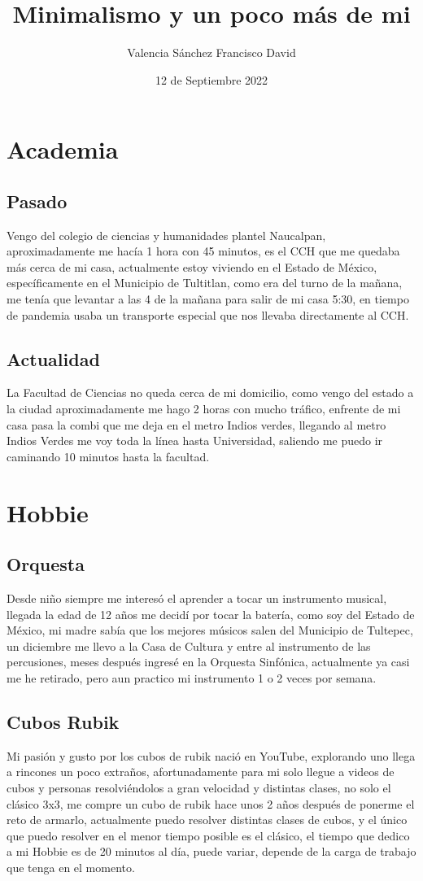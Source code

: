\documentclass[12pt, letterpaper]{article}
\title{Minimalismo y un poco más de mi}
\author{Valencia Sánchez Francisco David}
\date{12 de Septiembre 2022}
\begin{document}
\maketitle

\section{\huge{Academia} }
\subsection{\Large{Pasado}}
Vengo del colegio de ciencias y humanidades plantel Naucalpan, aproximadamente me hacía 1 hora con 45 minutos, es el CCH que me quedaba más cerca de mi casa, actualmente estoy viviendo en el Estado de México, específicamente en el Municipio de Tultitlan, como era del turno de la mañana, me tenía que levantar a las 4 de la mañana para salir de mi casa 5:30, en tiempo de pandemia usaba un transporte especial que nos llevaba directamente al CCH.
\subsection{\Large{Actualidad}}
La Facultad de Ciencias no queda cerca de mi domicilio, como vengo del estado a la ciudad aproximadamente me hago 2 horas con mucho tráfico, enfrente de mi casa pasa la combi que me deja en el metro Indios verdes, llegando al metro Indios Verdes me voy toda la línea hasta Universidad, saliendo me puedo ir caminando 10 minutos hasta la facultad.
\section{\huge{Hobbie}}
\subsection{\Large{Orquesta} }
Desde niño siempre me interesó el aprender a tocar un instrumento musical, llegada la edad de 12 años me decidí por tocar la batería, como soy del Estado de México, mi madre sabía que los mejores músicos salen del Municipio de Tultepec, un diciembre me llevo a la Casa de Cultura y entre al instrumento de las percusiones, meses después ingresé en la Orquesta Sinfónica, actualmente ya casi me he retirado, pero aun practico mi instrumento 1 o 2 veces por semana.
\subsection{\Large{Cubos Rubik}}
Mi pasión y gusto por los cubos de rubik nació en YouTube, explorando uno llega a rincones un poco extraños, afortunadamente para mi solo llegue a videos de cubos y personas resolviéndolos a gran velocidad y distintas clases, no solo el clásico 3x3, me compre un cubo de rubik hace unos 2 años después de ponerme el reto de armarlo, actualmente puedo resolver distintas clases de cubos, y el único que puedo resolver en el menor tiempo posible es el clásico, el tiempo que dedico a mi Hobbie es de 20 minutos al día, puede variar, depende de la carga de trabajo que tenga en el momento.
\end{document}
